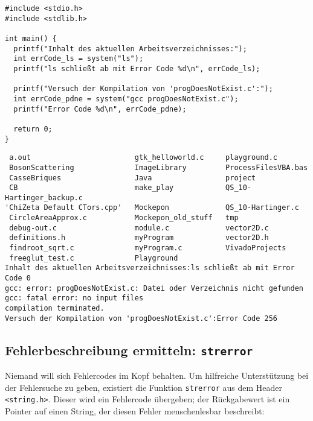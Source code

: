 \begin{codebox}
\begin{verbatim}
#include <stdio.h>
#include <stdlib.h>

int main() {
  printf("Inhalt des aktuellen Arbeitsverzeichnisses:");
  int errCode_ls = system("ls");
  printf("ls schließt ab mit Error Code %d\n", errCode_ls);

  printf("Versuch der Kompilation von 'progDoesNotExist.c':");
  int errCode_pdne = system("gcc progDoesNotExist.c");
  printf("Error Code %d\n", errCode_pdne);

  return 0;
}
\end{verbatim}
\end{codebox}

\begin{cmdbox}
\begin{verbatim}
 a.out                        gtk_helloworld.c     playground.c
 BosonScattering              ImageLibrary         ProcessFilesVBA.bas
 CasseBriques                 Java                 project
 CB                           make_play            QS_10-Hartinger_backup.c
'ChiZeta Default CTors.cpp'   Mockepon             QS_10-Hartinger.c
 CircleAreaApprox.c           Mockepon_old_stuff   tmp
 debug-out.c                  module.c             vector2D.c
 definitions.h                myProgram            vector2D.h
 findroot_sqrt.c              myProgram.c          VivadoProjects
 freeglut_test.c              Playground
Inhalt des aktuellen Arbeitsverzeichnisses:ls schließt ab mit Error Code 0
gcc: error: progDoesNotExist.c: Datei oder Verzeichnis nicht gefunden
gcc: fatal error: no input files
compilation terminated.
Versuch der Kompilation von 'progDoesNotExist.c':Error Code 256
\end{verbatim}
\end{cmdbox}


\subsection{Fehlerbeschreibung ermitteln: \texttt{strerror}}
Niemand will sich Fehlercodes im Kopf behalten. Um hilfreiche Unterstützung bei der Fehlersuche zu geben, existiert die Funktion \texttt{strerror} aus dem Header \texttt{<string.h>}. Dieser wird ein Fehlercode übergeben; der Rückgabewert ist ein Pointer auf einen String, der diesen Fehler menschenlesbar beschreibt:

